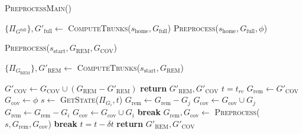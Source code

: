 \documentclass[letterpaper]{article} %
\begin{document}

\begin{algorithm}
\caption{\textsc{PreprocessMain()}}

\begin{algorithmic}[1]
\State $\{\Pi_{G^{\textrm{full}}}\}, G'_{\textrm{full}} \leftarrow$ \textsc{ComputeTrunks}($s_{\textrm{home}},G_{\textrm{full}}$)
\State \textsc{Preprocess}($s_{\textrm{home}},G_{\textrm{full}},\phi$)
\end{algorithmic}
\end{algorithm}

\begin{algorithm}
\caption{\textsc{Preprocess}($s_{\textrm{start}},G_{\textrm{REM}},G_{\textrm{COV}}$)}\label{alg:1}
\begin{algorithmic}[1]
\State $\{\Pi_{G_{\textrm{REM}}}\}, G'_{\textrm{REM}} \leftarrow$ \textsc{ComputeTrunks}($s_{\textrm{start}},G_{\textrm{REM}}$)

\State $G'_{\textrm{COV}} \leftarrow G_{\textrm{COV}} \cup (G_{\textrm{REM}} - G'_{\textrm{REM}})$
    \State \textbf{return} $G'_{\textrm{REM}},G'_{\textrm{COV}}$
\EndIf
{}
    \State $t = t_{rc}$
    \State $G_{\textrm{rem}} \leftarrow G'_{\textrm{COV}}$
    \State $G_{\textrm{cov}} \leftarrow \phi$ 
        \State $s \leftarrow$ \textsc{GetState($\Pi_{G_i}, t$)}
       {\color{blue}
                \State $G_{\textrm{rem}} \leftarrow G_{\textrm{rem}} - G_j$
                \State $G_{\textrm{cov}} \leftarrow G_{\textrm{cov}} \cup G_j$
            \EndIf
        \EndFor
        \State $G_{\textrm{rem}} \leftarrow G_{\textrm{rem}} - G_i$
        \State $G_{\textrm{cov}} \leftarrow G_{\textrm{cov}} \cup G_i$
        }
            \State \textbf{break}
        \EndIf
        \State $G_{\textrm{rem}},G_{\textrm{cov}} \leftarrow$ \textsc{Preprocess}($s,G_{\textrm{rem}},G_{\textrm{cov}}$)
            \State \textbf{break}
        \EndIf
        \State $t = t - \delta t$
    \EndWhile
\EndFor
\State \textbf{return} $G'_{\textrm{REM}},G'_{\textrm{COV}}$

\end{algorithmic}
\end{algorithm}
\end{document}

